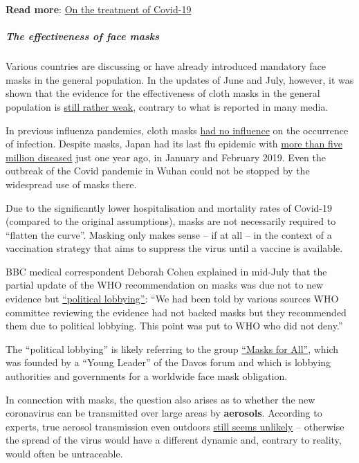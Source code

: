 \textbf{Read more}:
\href{https://swprs.org/on-the-treatment-of-covid-19/}{On the treatment
of Covid-19}

\hypertarget{the-effectiveness-of-face-masks}{%
\subparagraph{\texorpdfstring{\textbf{The effectiveness of face
masks}}{The effectiveness of face masks}}\label{the-effectiveness-of-face-masks}}

Various countries are discussing or have already introduced mandatory
face masks in the general population. In the updates of June and July,
however, it was shown that the evidence for the effectiveness of cloth
masks in the general population is
\href{https://swprs.org/face-masks-evidence/}{still rather weak},
contrary to what is reported in many media.

In previous influenza pandemics, cloth masks
\href{https://wwwnc.cdc.gov/eid/article/26/5/19-0994_article}{had no
influence} on the occurrence of infection. Despite masks, Japan had its
last flu epidemic with
\href{https://www.upi.com/Top_News/World-News/2019/02/01/Millions-in-Japan-affected-as-flu-outbreak-grips-country/9191549043797/}{more
than five million diseased} just one year ago, in January and February
2019. Even the outbreak of the Covid pandemic in Wuhan could not be
stopped by the widespread use of masks there.

Due to the significantly lower hospitalisation and mortality rates of
Covid-19 (compared to the original assumptions), masks are not
necessarily required to ``flatten the curve''. Masking only makes sense
-- if at all -- in the context of a vaccination strategy that aims to
suppress the virus until a vaccine is available.

BBC medical correspondent Deborah Cohen explained in mid-July that the
partial update of the WHO recommendation on masks was due not to new
evidence but
\href{https://twitter.com/ClarkeMicah/status/1282987860090593280}{``political
lobbying''}: ``We had been told by various sources WHO committee
reviewing the evidence had not backed masks but they recommended them
due to political lobbying. This point was put to WHO who did not deny.''

The ``political lobbying'' is likely referring to the group
\href{https://masks4all.co/about-us/}{``Masks for All''}, which was
founded by a ``Young Leader'' of the Davos forum and which is lobbying
authorities and governments for a worldwide face mask obligation.

In connection with masks, the question also arises as to whether the new
coronavirus can be transmitted over large areas by \textbf{aerosols}.
According to experts, true aerosol transmission even outdoors
\href{https://jamanetwork.com/journals/jama/fullarticle/2768396}{still
seems unlikely} -- otherwise the spread of the virus would have a
different dynamic and, contrary to reality, would often be untraceable.

